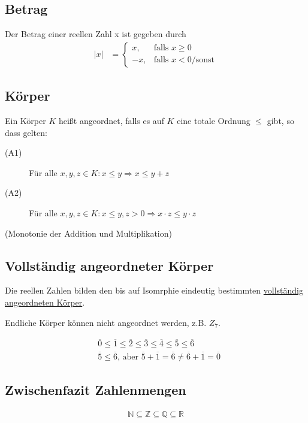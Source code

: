 \subsection{Betrag}
Der Betrag einer reellen Zahl x ist gegeben durch
\begin{align*}
|x| &= \left\{\begin{array}{cl} x, & \mbox{falls }x \geq 0\\ -x, & \mbox{falls } x < 0 \mbox{/sonst} \end{array}\right.
\end{align*}

\subsection{Körper}
Ein Körper $K$ heißt angeordnet, falls es auf $K$ eine totale Ordnung $\leq$ gibt, so dass gelten:
\begin{description}
\item[(A1)]{Für alle $x, y, z \in K : x \leq y \Rightarrow x \leq y + z$}
\item[(A2)]{Für alle $x, y, z \in K : x \leq y, z > 0 \Rightarrow x\cdot z \leq y\cdot z$}
\end{description}
(Monotonie der Addition und Multiplikation)

\subsection{Vollständig angeordneter Körper}
Die reellen Zahlen bilden den bis auf Isomrphie eindeutig bestimmten \underline{vollständig angeordneten Körper}.

Endliche Körper können nicht angeordnet werden, z.B. $Z_7$.

\begin{align*}
&\overline{0} \leq \overline{1} \leq \overline{2} \leq \overline{3} \leq \overline{4} \leq \overline{5} \leq \overline{6} \\
&\overline{5} \leq \overline{6}\text{, aber }\overline{5} + \overline{1} = \overline{6} \neq \overline{6} + \overline{1} = \overline{0}
\end{align*}

\subsection{Zwischenfazit Zahlenmengen}
\begin{align*}
	\mathbb{N} \subseteq \mathbb{Z} \subseteq \mathbb{Q} \subseteq \mathbb{R}
\end{align*}

